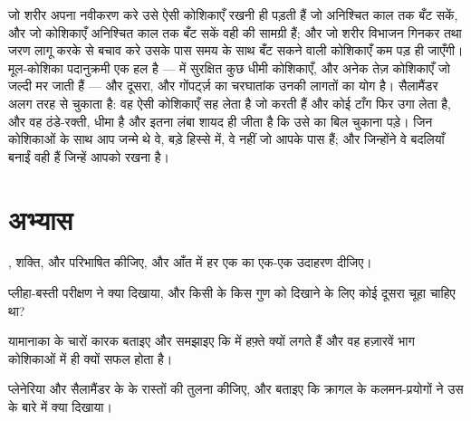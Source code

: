 \begin{remark}\label{rem:b3:stem-cells:remark}
जो शरीर अपना नवीकरण करे उसे ऐसी कोशिकाएँ रखनी ही पड़ती हैं जो अनिश्चित
काल तक बँट सकें, और जो कोशिकाएँ अनिश्चित काल तक बँट सकें वही  की
सामग्री हैं; और जो शरीर विभाजन गिनकर तथा जरण लागू करके  से बचाव
करे उसके पास समय के साथ बँट सकने वाली कोशिकाएँ कम पड़ ही जाएँगी।
मूल-कोशिका पदानुक्रमी एक हल है ---  में सुरक्षित कुछ धीमी
कोशिकाएँ, और अनेक तेज़ कोशिकाएँ जो जल्दी मर जाती हैं --- और  दूसरा, और गोंपर्ट्ज़ का चरघातांक उनकी लागतों का योग है। सैलामैंडर
अलग तरह से चुकाता है: वह ऐसी कोशिकाएँ सह लेता है जो  करती
हैं और कोई टाँग फिर उगा लेता है, और वह ठंडे-रक्ती, धीमा है और इतना लंबा
शायद ही जीता है कि उसे  का बिल चुकाना पड़े। जिन कोशिकाओं के साथ आप
जन्मे थे वे, बड़े हिस्से में, वे नहीं जो आपके पास हैं; और जिन्होंने वे
बदलियाँ बनाईं वही हैं जिन्हें आपको रखना है।
\end{remark}

\section{अभ्यास}

\begin{exercise}[$\star$]\label{exo:b3:stem-cells:1}
, शक्ति,  और  परिभाषित कीजिए, और
आँत में हर एक का एक-एक उदाहरण दीजिए।
\end{exercise}

\begin{exercise}[$\star$]\label{exo:b3:stem-cells:2}
प्लीहा-बस्ती परीक्षण ने क्या दिखाया, और किसी  के किस गुण को
दिखाने के लिए कोई दूसरा चूहा चाहिए था?
\end{exercise}

\begin{exercise}[$\star$]\label{exo:b3:stem-cells:3}
यामानाका के चारों कारक बताइए और समझाइए कि  में हफ़्ते क्यों
लगते हैं और वह हज़ारवें भाग कोशिकाओं में ही क्यों सफल होता है।
\end{exercise}

\begin{exercise}[$\star$]\label{exo:b3:stem-cells:4}
प्लेनेरिया और सैलामैंडर के  के रास्तों की तुलना कीजिए, और
बताइए कि क्रागल के कलमन-प्रयोगों ने उस  के बारे में क्या
दिखाया।
\end{exercise}

